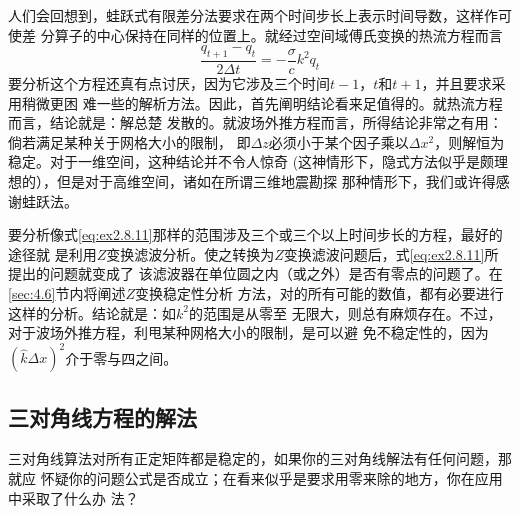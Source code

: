 人们会回想到，蛙跃式有限差分法要求在两个时间步长上表示时间导数，这样作可使差
分算子的中心保持在同样的位置上。就经过空间域傅氏变换的热流方程而言
\begin{equation}
\frac{q_{t+1}-q_t}{2\Delta t}=-\frac{\sigma}{c}k^2q_t
\label{eq:ex2.8.11}
\end{equation}
要分析这个方程还真有点讨厌，因为它涉及三个时间$t-1$，$t$和$t+1$，并且要求采用稍微更困
难一些的解析方法。因此，首先阐明结论看来足值得的。就热流方程而言，结论就是：解总楚
发散的。就波场外推方程而言，所得结论非常之有用：倘若满足某种关于网格大小的限制，
即$\Delta z$必须小于某个因子乘以$\Delta x^2$，则解恒为稳定。对于一维空间，这种结论并不令人惊奇
(这神情形下，隐式方法似乎是颇理想的），但是对于高维空间，诸如在所谓三维地震勘探
那种情形下，我们或许得感谢蛙跃法。

要分析像式\ref{eq:ex2.8.11}那样的范围涉及三个或三个以上时间步长的方程，最好的途径就
是利用$Z$变换滤波分析。使之转换为$Z$变换滤波问题后，式\ref{eq:ex2.8.11}所提出的问题就变成了
该滤波器在单位圆之内（或之外）是否有零点的问题了。在\ref{sec:4.6}节内将阐述$Z$变换稳定性分析
方法，对的所有可能的数值，都有必要进行这样的分析。结论就是：如$k^2$的范围是从零至
无限大，则总有麻烦存在。不过，对于波场外推方程，利甩某种网格大小的限制，是可以避
免不稳定性的，因为$(\hat{k}\Delta x)^2$介于零与四之间。

\subsection{三对角线方程的解法}
\label{sec:2.8.5}

三对角线算法对所有正定矩阵都是稳定的，如果你的三对角线解法有任何问题，那就应
怀疑你的问题公式是否成立；在看来似乎是要求用零来除的地方，你在应用中采取了什么办
法？
